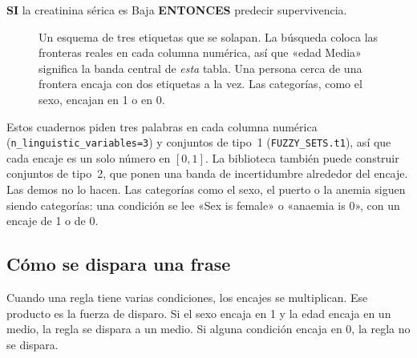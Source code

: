 \documentclass[11pt]{article}
\newcommand{\fn}[1]{\texttt{\small #1}}
\begin{document}
\begin{center}
{\sffamily\bfseries SI} la creatinina sérica es Baja \textbf{ENTONCES} predecir supervivencia.
\end{center}

\begin{figure}[H]
\centering
{}
\caption{Un esquema de tres etiquetas que se solapan. La búsqueda coloca las fronteras reales en cada columna numérica, así que «edad Media» significa la banda central de \emph{esta} tabla. Una persona cerca de una frontera encaja con dos etiquetas a la vez. Las categorías, como el sexo, encajan en 1 o en 0.}
\end{figure}

\noindent
Estos cuadernos piden tres palabras en cada columna numérica (\fn{n\_linguistic\_variables=3}) y conjuntos de tipo~1 (\fn{FUZZY\_SETS.t1}), así que cada encaje es un solo número en \([0,1]\). La biblioteca también puede construir conjuntos de tipo~2, que ponen una banda de incertidumbre alrededor del encaje. Las demos no lo hacen. Las categorías como el sexo, el puerto o la anemia siguen siendo categorías: una condición se lee «Sex is female» o «anaemia is 0», con un encaje de 1 o de 0.

\subsection{Cómo se dispara una frase}

Cuando una regla tiene varias condiciones, los encajes se multiplican. Ese producto es la fuerza de disparo. Si el sexo encaja en 1 y la edad encaja en un medio, la regla se dispara a un medio. Si alguna condición encaja en 0, la regla no se dispara.
\end{document}
